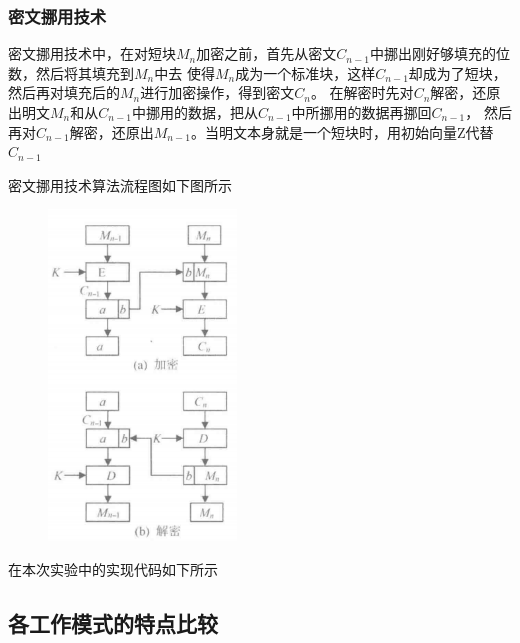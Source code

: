 \documentclass[a4paper,11pt,UTF8]{ctexart}
\newcommand{\bottomcaption}{%
\setlength{\abovecaptionskip}{6pt}%
\setlength{\belowcaptionskip}{6pt}%
\caption}
\newcommand{\xiaowuhao}{\fontsize{9pt}{\baselineskip}\selectfont}   %
\begin{document}
        \subsubsection{密文挪用技术}
            密文挪用技术中，在对短块$M_{n}$加密之前，首先从密文$C_{n-1}$中挪出刚好够填充的位数，然后将其填充到$M_{n}$中去
            使得$M_{n}$成为一个标准块，这样$C_{n-1}$却成为了短块，然后再对填充后的$M_{n}$进行加密操作，得到密文$C_{n}$。
            在解密时先对$C_{n}$解密，还原出明文$M_{n}$和从$C_{n-1}$中挪用的数据，把从$C_{n-1}$中所挪用的数据再挪回$C_{n-1}$，
            然后再对$C_{n-1}$解密，还原出$M_{n-1}$。当明文本身就是一个短块时，用初始向量Z代替$C_{n-1}$\par
            密文挪用技术算法流程图如下图所示
            \begin{figure}[H]
                \centering
                \includegraphics[width=5cm]{密文挪用.png}
                \bottomcaption{\xiaowuhao{密文挪用技术}}
            \end{figure}
            在本次实验中的实现代码如下所示
            


    \subsection{各工作模式的特点比较}
\end{document}
